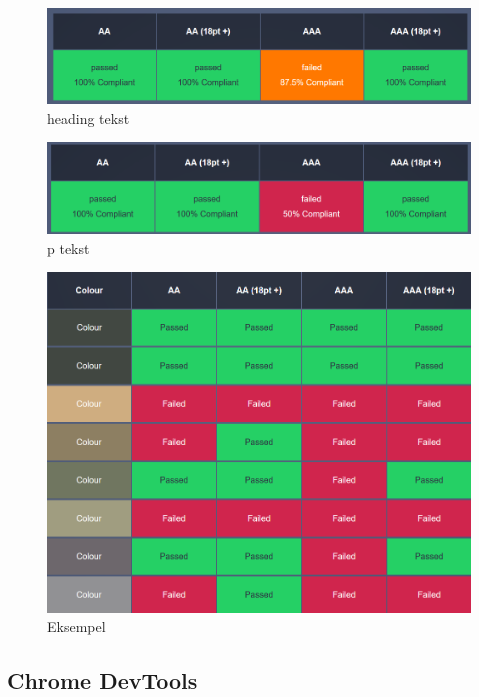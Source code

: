 \begin{figure}[H]
    \centering
    \includegraphics[width=\textwidth]{bjornar/bg-image-h1.png}
    \caption{heading tekst}
    \label{fig:analysis-current-a11y_bg-h1}
\end{figure}

\begin{figure}[H]
    \centering
    \includegraphics[width=\textwidth]{bjornar/bg-image-p.png}
    \caption{p tekst}
    \label{fig:analysis-current-a11y_bg-p}
\end{figure}

\begin{figure}[H]
    \centering
    \includegraphics[width=\textwidth]{bjornar/bg-image-eksempel.png}
    \caption{Eksempel}
    \label{fig:analysis-current-a11y_bg-example}
\end{figure}


\subsection{Chrome DevTools}

